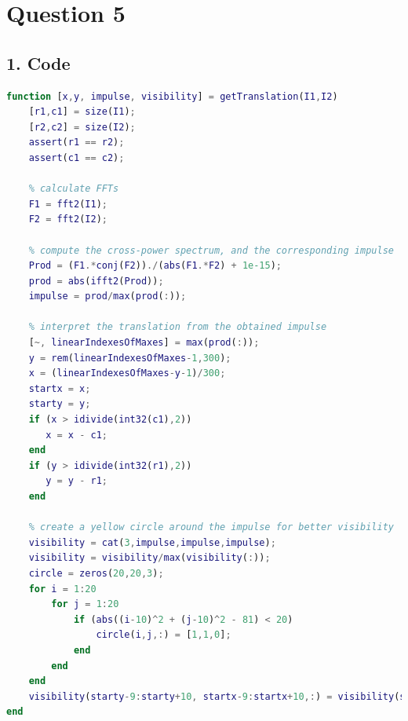 \documentclass[12pt, a4paper]{article}
\begin{document}
\vspace*{-22pt}
\section*{Question 5}
\subsection*{1. Code}
\begin{lstlisting}[language=Matlab]
function [x,y, impulse, visibility] = getTranslation(I1,I2)
    [r1,c1] = size(I1);
    [r2,c2] = size(I2);
    assert(r1 == r2);
    assert(c1 == c2);
    
    % calculate FFTs
    F1 = fft2(I1);
    F2 = fft2(I2);
    
    % compute the cross-power spectrum, and the corresponding impulse
    Prod = (F1.*conj(F2))./(abs(F1.*F2) + 1e-15);
    prod = abs(ifft2(Prod));
    impulse = prod/max(prod(:));
    
    % interpret the translation from the obtained impulse
    [~, linearIndexesOfMaxes] = max(prod(:));
    y = rem(linearIndexesOfMaxes-1,300);
    x = (linearIndexesOfMaxes-y-1)/300;
    startx = x;
    starty = y;
    if (x > idivide(int32(c1),2))
       x = x - c1;
    end
    if (y > idivide(int32(r1),2))
       y = y - r1;
    end
    
    % create a yellow circle around the impulse for better visibility
    visibility = cat(3,impulse,impulse,impulse);
    visibility = visibility/max(visibility(:));
    circle = zeros(20,20,3);
    for i = 1:20
        for j = 1:20
            if (abs((i-10)^2 + (j-10)^2 - 81) < 20)
                circle(i,j,:) = [1,1,0];
            end
        end
    end
    visibility(starty-9:starty+10, startx-9:startx+10,:) = visibility(starty-9:starty+10, startx-9:startx+10,:) + circle;
end
\end{lstlisting}
\newpage
\end{document}
